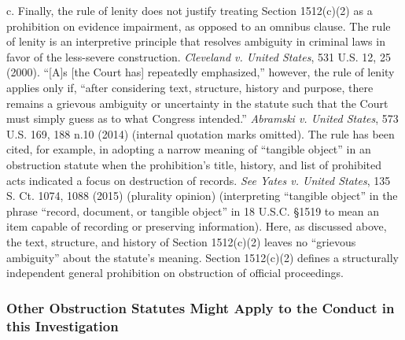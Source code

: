 c. Finally, the rule of lenity does not justify treating Section 1512(c)(2) as a prohibition on evidence impairment, as opposed to an omnibus clause.
The rule of lenity is an interpretive principle that resolves ambiguity in criminal laws in favor of the less-severe construction.
\textit{Cleveland v. United States}, 531 U.S. 12, 25 (2000).
“[A]s [the Court has] repeatedly emphasized,” however, the rule of lenity applies only if, “after considering text, structure, history and purpose, there remains a grievous ambiguity or uncertainty in the statute such that the Court must simply guess as to what Congress intended.”
\textit{Abramski v. United States}, 573 U.S. 169, 188 n.10 (2014) (internal quotation marks omitted).
The rule has been cited, for example, in adopting a narrow meaning of “tangible object” in an obstruction statute when the prohibition’s title, history, and list of prohibited acts indicated a focus on destruction of records.
\textit{See Yates v. United States}, 135 S. Ct. 1074, 1088 (2015) (plurality opinion) (interpreting “tangible object” in the phrase “record, document, or tangible object” in 18 U.S.C. \S 1519 to mean an item capable of recording or preserving information).
Here, as discussed above, the text, structure, and history of Section 1512(c)(2) leaves no “grievous ambiguity” about the statute’s meaning.
Section 1512(c)(2) defines a structurally independent general prohibition on obstruction of official proceedings.

\subsubsection{Other Obstruction Statutes Might Apply to the Conduct in this Investigation}

